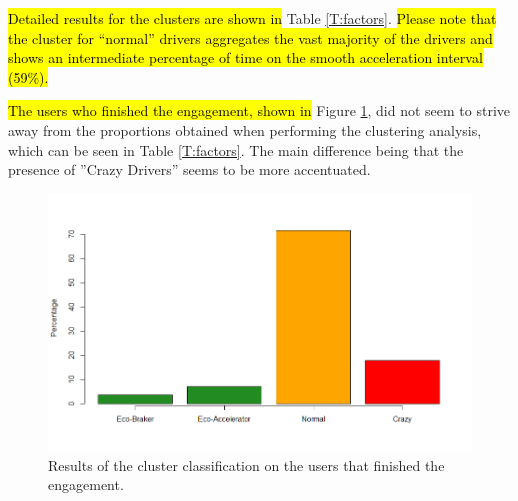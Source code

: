 \documentclass[preprint,authoryear,12pt]{elsarticle}
\begin{document}



\hl{Detailed results for the clusters are shown in} Table \ref{T:factors}.
\hl{Please note that the cluster for ``normal'' drivers aggregates the vast majority of the drivers and shows an intermediate percentage of time on the smooth acceleration interval (59\%).}

\hl{The users who finished the engagement, shown in 
}Figure \ref{fig:clusteringengagement}, did not seem to strive away from the proportions obtained when performing the clustering analysis, which can be seen in Table \ref{T:factors}. The main difference being that the presence of ''Crazy Drivers'' seems to be more accentuated.

\begin{figure}[tb]
	\begin{center}
		\includegraphics[width=1\linewidth]{ijhcs14-img/Rplot01}
		\caption{Results of the cluster classification on the users that finished the engagement. \label{fig:clusteringengagement}}
	\end{center}
\end{figure}


\end{document}
